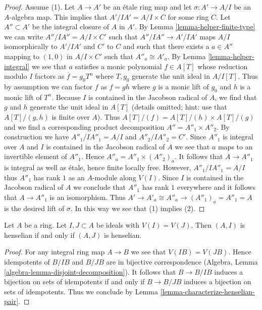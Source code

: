 \begin{proof}
\medskip\noindent
Assume (1). Let $A \to A'$ be an \'etale ring map and let
$\sigma : A' \to A/I$ be an $A$-algebra map. This implies that
$A'/IA' = A/I \times C$ for some ring $C$. Let $A'' \subset A'$ be the integral
closure of $A$ in $A'$. By Lemma \ref{lemma-helper-finite-type}
we can write $A''/IA'' = A/I \times C'$ such that $A''/IA'' \to A'/IA'$
maps $A/I$ isomorphically to $A'/IA'$ and $C'$ to $C$ and such that
there exists a $a \in A''$ mapping to $(1, 0)$ in $A/I \times C'$
such that $A''_a \cong A'_a$.
By Lemma \ref{lemma-helper-integral}
we see that $a$ satisfies a monic polynomial $f \in A[T]$ whose
reduction modulo $I$ factors as $\overline{f} = g_0 T^n$ where
$T, g_0$ generate the unit ideal in $A/I[T]$. Thus by assumption
we can factor $f$ as $f = g h$ where $g$ is a monic lift of $g_0$ and
$h$ is a monic lift of $T^n$. Because $I$ is contained in the Jacobson radical
of $A$, we find that $g$ and $h$ generate the unit ideal in $A[T]$
(details omitted; hint: use that $A[T]/(g, h)$ is finite over $A$).
Thus $A[T]/(f) = A[T]/(h) \times A[T]/(g)$ and we find a corresponding
product decomposition $A'' = A''_1 \times A''_2$. By construction
we have $A''_1/IA''_1 = A/I$ and $A''_2/IA''_2 = C'$. Since $A''_1$
is integral over $A$ and $I$ is contained in the Jacobson radical of $A$ we
see that $a$ maps to an invertible element of $A''_1$. Hence
$A''_a = A''_1 \times (A''_2)_a$. It follows that $A \to A''_1$
is integral as well as \'etale, hence finite locally free.
However, $A''_1/IA''_1 = A/I$ thus $A''_1$ has rank $1$ as an
$A$-module along $V(I)$. Since $I$ is contained in the Jacobson radical
of $A$ we conclude that $A''_1$ has rank $1$ everywhere and
it follows that $A \to A''_1$ is an isomorphism. Thus
$A' \to A'_a \cong A''_a \to (A''_1)_a = A''_1 = A$ is the
desired lift of $\sigma$. In this way we see that (1) implies (2).
\end{proof}

\begin{lemma}
\label{lemma-change-ideal-henselian-pair}
Let $A$ be a ring. Let $I, J \subset A$ be ideals with $V(I) = V(J)$.
Then $(A, I)$ is henselian if and only if $(A, J)$ is henselian.
\end{lemma}

\begin{proof}
For any integral ring map $A \to B$ we see that $V(IB) = V(JB)$.
Hence idempotents of $B/IB$ and $B/JB$ are in bijective correspondence
(Algebra, Lemma \ref{algebra-lemma-disjoint-decomposition}).
It follows that $B \to B/IB$ induces a bijection on sets of
idempotents if and only if $B \to B/JB$ induces a bijection on sets
of idempotents. Thus we conclude by
Lemma \ref{lemma-characterize-henselian-pair}.
\end{proof}

